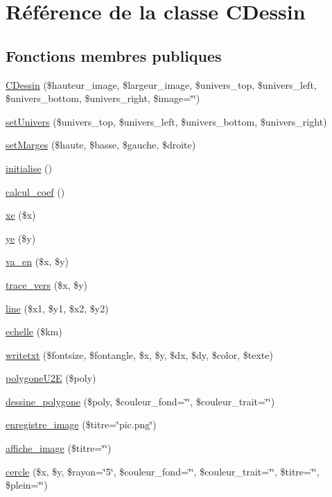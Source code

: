 \hypertarget{classCDessin}{
\section{R\'{e}f\'{e}rence de la classe CDessin}
\label{classCDessin}
}
\subsection*{Fonctions membres publiques}
\begin{CompactItemize}
\item 
\hyperlink{classCDessin_a0}{CDessin} (\$hauteur\_\-image, \$largeur\_\-image, \$univers\_\-top, \$univers\_\-left, \$univers\_\-bottom, \$univers\_\-right, \$image=\char`\"{}\char`\"{})
\item 
\hyperlink{classCDessin_a1}{set\-Univers} (\$univers\_\-top, \$univers\_\-left, \$univers\_\-bottom, \$univers\_\-right)
\item 
\hyperlink{classCDessin_a2}{set\-Marges} (\$haute, \$basse, \$gauche, \$droite)
\item 
\hyperlink{classCDessin_a3}{initialise} ()
\item 
\hyperlink{classCDessin_a4}{calcul\_\-coef} ()
\item 
\hyperlink{classCDessin_a5}{xe} (\$x)
\item 
\hyperlink{classCDessin_a6}{ye} (\$y)
\item 
\hyperlink{classCDessin_a7}{va\_\-en} (\$x, \$y)
\item 
\hyperlink{classCDessin_a8}{trace\_\-vers} (\$x, \$y)
\item 
\hyperlink{classCDessin_a9}{line} (\$x1, \$y1, \$x2, \$y2)
\item 
\hyperlink{classCDessin_a10}{echelle} (\$km)
\item 
\hyperlink{classCDessin_a11}{writetxt} (\$fontsize, \$fontangle, \$x, \$y, \$dx, \$dy, \$color, \$texte)
\item 
\hyperlink{classCDessin_a12}{polygone\-U2E} (\$poly)
\item 
\hyperlink{classCDessin_a13}{dessine\_\-polygone} (\$poly, \$couleur\_\-fond=\char`\"{}\char`\"{}, \$couleur\_\-trait=\char`\"{}\char`\"{})
\item 
\hyperlink{classCDessin_a14}{enregistre\_\-image} (\$titre=\char`\"{}pic.png\char`\"{})
\item 
\hyperlink{classCDessin_a15}{affiche\_\-image} (\$titre=\char`\"{}\char`\"{})
\item 
\hyperlink{classCDessin_a16}{cercle} (\$x, \$y, \$rayon=\char`\"{}5\char`\"{}, \$couleur\_\-fond=\char`\"{}\char`\"{}, \$couleur\_\-trait=\char`\"{}\char`\"{}, \$titre=\char`\"{}\char`\"{}, \$plein=\char`\"{}\char`\"{})

\end{CompactItemize}
